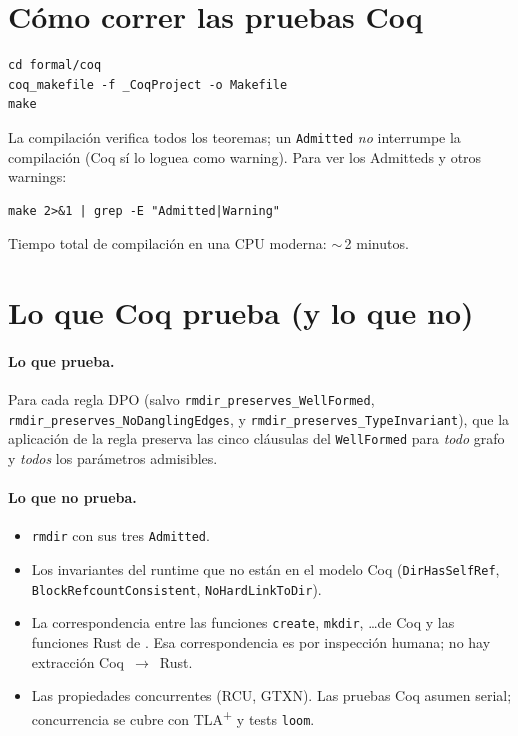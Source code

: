 \section{Cómo correr las pruebas Coq}

\begin{lstlisting}[language=shellcmd]
cd formal/coq
coq_makefile -f _CoqProject -o Makefile
make
\end{lstlisting}

La compilación verifica todos los teoremas; un \texttt{Admitted}
\emph{no} interrumpe la compilación (Coq sí lo loguea como warning).
Para ver los Admitteds y otros warnings:

\begin{lstlisting}[language=shellcmd]
make 2>&1 | grep -E "Admitted|Warning"
\end{lstlisting}

Tiempo total de compilación en una CPU moderna: $\sim$\,2 minutos.

\section{Lo que Coq prueba (y lo que no)}

\paragraph{Lo que prueba.} Para cada regla DPO (salvo
\texttt{rmdir\_preserves\_WellFormed}, \texttt{rmdir\_preserves\_NoDanglingEdges},
y \texttt{rmdir\_preserves\_TypeInvariant}), que la aplicación de la
regla preserva las cinco cláusulas del \texttt{WellFormed} para
\emph{todo} grafo y \emph{todos} los parámetros admisibles.

\paragraph{Lo que no prueba.}
\begin{itemize}
  \item \texttt{rmdir} con sus tres \texttt{Admitted}.
  \item Los invariantes del runtime que no están en el modelo Coq
    (\texttt{DirHasSelfRef}, \texttt{BlockRefcountConsistent},
    \texttt{NoHardLinkToDir}).
  \item La correspondencia entre las funciones \texttt{create},
    \texttt{mkdir}, \dots de Coq y las funciones Rust de
    . Esa correspondencia es por inspección
    humana; no hay extracción Coq~$\to$~Rust.
  \item Las propiedades concurrentes (RCU, GTXN). Las pruebas Coq
    asumen serial; concurrencia se cubre con TLA\textsuperscript{+} y
    tests \texttt{loom}.
\end{itemize}

